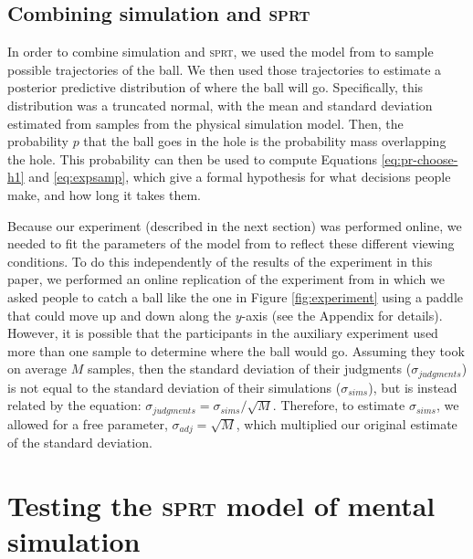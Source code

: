 \documentclass[10pt,letterpaper]{article}
\begin{document}
\subsection{Combining simulation and \textsc{sprt}}

In order to combine simulation and \textsc{sprt}, we used the model from  to sample possible trajectories of the ball.
We then used those trajectories to estimate a posterior predictive distribution of where the ball will go.
Specifically, this distribution was a truncated normal, with the mean and standard deviation estimated from samples from the physical simulation model.
Then, the probability $p$ that the ball goes in the hole is the probability mass overlapping the hole.
This probability can then be used to compute Equations \ref{eq:pr-choose-h1} and \ref{eq:expsamp}, which give a formal hypothesis for what decisions people make, and how long it takes them.

Because our experiment (described in the next section) was performed online, we needed to fit the parameters of the model from  to reflect these different viewing conditions.
To do this independently of the results of the experiment in this paper, we performed an online replication of the experiment from  in which we asked people to catch a ball like the one in Figure \ref{fig:experiment} using a paddle that could move up and down along the $y$-axis (see the Appendix for details).
However, it is possible that the participants in the auxiliary experiment used more than one sample to determine where the ball would go.
Assuming they took on average $M$ samples, then the standard deviation of their judgments ($\sigma_{judgments}$) is not equal to the standard deviation of their simulations ($\sigma_{sims}$), but is instead related by the equation: $\sigma_{judgments} = \sigma_{sims} / \sqrt{M}$.
Therefore, to estimate $\sigma_{sims}$, we allowed for a free parameter, $\sigma_{adj}=\sqrt{M}$, which multiplied our original estimate of the standard deviation.

\section{Testing the \textsc{sprt} model of mental simulation}
\end{document}

